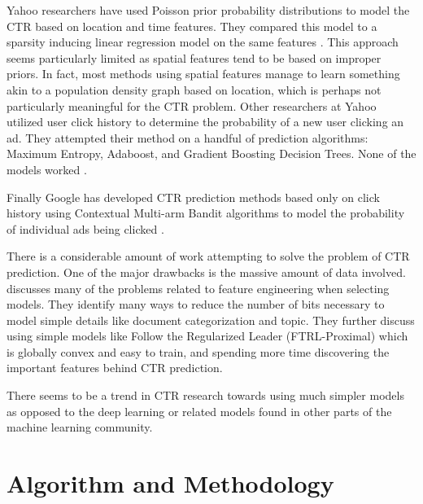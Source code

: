 \documentclass[fleqn,10pt]{SelfArx} %
\begin{document}
Yahoo researchers have used Poisson prior probability distributions to model the CTR based on location and time features. They compared this model to a sparsity inducing linear regression model on the same features \cite{agarwal2009spatio}. This approach seems particularly limited as spatial features tend to be based on improper priors. In fact, most methods using spatial features manage to learn something akin to a population density graph based on location, which is perhaps not particularly meaningful for the CTR problem. Other researchers at Yahoo utilized user click history to determine the probability of a new user clicking an ad. They attempted their method on a handful of prediction algorithms: Maximum Entropy, Adaboost, and Gradient Boosting Decision Trees. None of the models worked \cite{hillard2010improving}.

Finally Google has developed CTR prediction methods based only on click history using Contextual Multi-arm Bandit algorithms to model the probability of individual ads being clicked \cite{lu2010contextual}.

There is a considerable amount of work attempting to solve the problem of CTR prediction. One of the major drawbacks is the massive amount of data involved. \cite{mcmahan2013ad} discusses many of the problems related to feature engineering when selecting models. They identify many ways to reduce the number of bits necessary to model simple details like document categorization and topic. They further discuss using simple models like Follow the Regularized Leader (FTRL-Proximal) which is globally convex and easy to train, and spending more time discovering the important features behind CTR prediction.

There seems to be a trend in CTR research towards using much simpler models as opposed to the deep learning or related models found in other parts of the machine learning community.


\section{Algorithm and Methodology}

\end{document}
